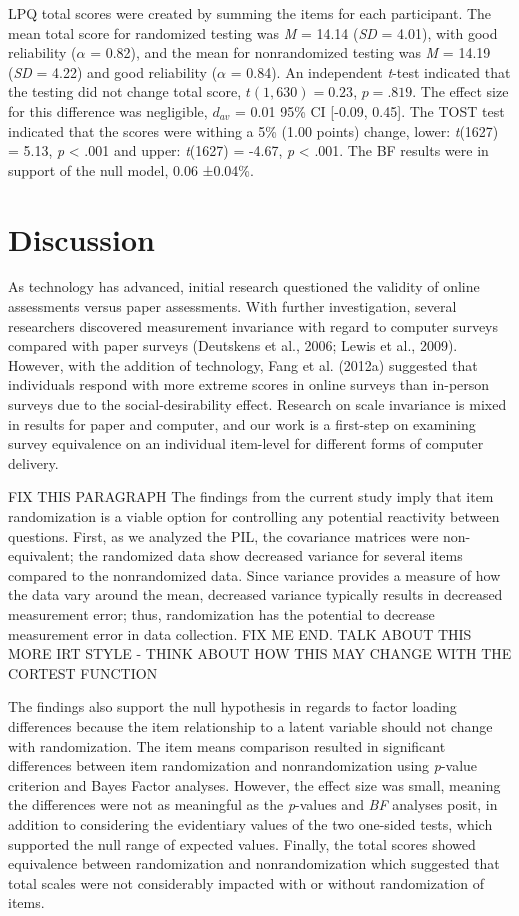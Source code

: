 \documentclass[english,man, mask]{apa6}
\theoremstyle{definition}
\theoremstyle{definition}
\theoremstyle{definition}
\theoremstyle{remark}
\begin{document}
LPQ total scores were created by summing the items for each participant.
The mean total score for randomized testing was \emph{M} = 14.14
(\emph{SD} = 4.01), with good reliability (\(\alpha\) = 0.82), and the
mean for nonrandomized testing was \emph{M} = 14.19 (\emph{SD} = 4.22)
and good reliability (\(\alpha\) = 0.84). An independent \emph{t}-test
indicated that the testing did not change total score,
\(t(1,630) = 0.23\), \(p = .819\). The effect size for this difference
was negligible, \(d_{av}\) = 0.01 95\% CI {[}-0.09, 0.45{]}. The TOST
test indicated that the scores were withing a 5\% (1.00 points) change,
lower: \emph{t}(1627) = 5.13, \emph{p} \textless{} .001 and upper:
\emph{t}(1627) = -4.67, \emph{p} \textless{} .001. The BF results were
in support of the null model, 0.06 ±0.04\%.

\section{Discussion}\label{discussion}

As technology has advanced, initial research questioned the validity of
online assessments versus paper assessments. With further investigation,
several researchers discovered measurement invariance with regard to
computer surveys compared with paper surveys (Deutskens et al., 2006;
Lewis et al., 2009). However, with the addition of technology, Fang et
al. (2012a) suggested that individuals respond with more extreme scores
in online surveys than in-person surveys due to the social-desirability
effect. Research on scale invariance is mixed in results for paper and
computer, and our work is a first-step on examining survey equivalence
on an individual item-level for different forms of computer delivery.

FIX THIS PARAGRAPH The findings from the current study imply that item
randomization is a viable option for controlling any potential
reactivity between questions. First, as we analyzed the PIL, the
covariance matrices were non-equivalent; the randomized data show
decreased variance for several items compared to the nonrandomized data.
Since variance provides a measure of how the data vary around the mean,
decreased variance typically results in decreased measurement error;
thus, randomization has the potential to decrease measurement error in
data collection. FIX ME END. TALK ABOUT THIS MORE IRT STYLE - THINK
ABOUT HOW THIS MAY CHANGE WITH THE CORTEST FUNCTION

The findings also support the null hypothesis in regards to factor
loading differences because the item relationship to a latent variable
should not change with randomization. The item means comparison resulted
in significant differences between item randomization and
nonrandomization using \emph{p}-value criterion and Bayes Factor
analyses. However, the effect size was small, meaning the differences
were not as meaningful as the \emph{p}-values and \emph{BF} analyses
posit, in addition to considering the evidentiary values of the two
one-sided tests, which supported the null range of expected values.
Finally, the total scores showed equivalence between randomization and
nonrandomization which suggested that total scales were not considerably
impacted with or without randomization of items.
\end{document}
